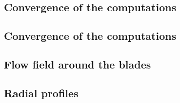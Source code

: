 
\subsection{Convergence of the computations} %
\label{sub:dream_convergence}

\subsection{Convergence of the computations} %
\label{sub:dream_convergence}



\subsection{Flow field around the blades} %
\label{sub:dream_flow_field}

\subsection{Radial profiles} %
\label{sub:dream_radial_profiles}